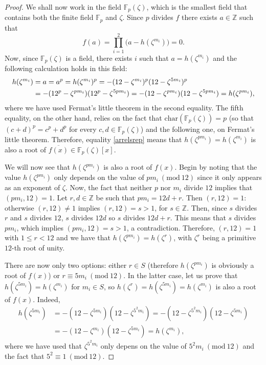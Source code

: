 \documentclass[a4paper, 12pt]{article}
\theoremstyle{definition}
\theoremstyle{remark}
\newcommand{\Z}{\ensuremath{\mathbb{Z}}}
\newcommand{\F}{\ensuremath{\mathbb{F}}}
\newcommand{\Mod}[1]{\ (\mathrm{mod}\ #1)} %
\begin{document}
\begin{proof}
We shall now work in the field $\F_p(\zeta)$, which is the smallest field that contains both the finite field $\F_p$ and $\zeta$. Since $p$ divides $f$ there exists $a\in\Z$ such that 
\begin{equation*}
f(a)=\prod_{i=1}^{2}\big(a-h(\zeta^{m_i})\big)=0.
\end{equation*}
Now, since $\F_p(\zeta)$ is a field, there exists $i$ such that $a=h(\zeta^{m_i})$ and the following calculation holds in this field:
\begin{align}\label{arrelsrep}
h(\zeta^{m_i})&=a=a^p=h(\zeta^{m_i})^p=-(12-\zeta^{m_i})^p(12-\zeta^{5m_i})^p\notag \\ 
&=-(12^p-\zeta^{pm_i})(12^p-\zeta^{5pm_i})=-(12-\zeta^{pm_i})(12-\zeta^{5pm_i})=h(\zeta^{pm_i}),
\end{align}
where we have used Fermat's little theorem in the second equality. The fifth equality, on the other hand, relies on the fact that $\text{char}(\F_p(\zeta))=p$ (so that $(c+d)^p=c^p+d^p$ for every $c,d \in \F_p(\zeta)$) and the following one, on Fermat's little theorem. Therefore, equality \eqref{arrelsrep} means that $h(\zeta^{pm_i})=h(\zeta^{m_i})$ is also a root of $\overline{f(x)}\in\F_p(\zeta)[x]$. 

We will now see that $h(\zeta^{pm_i})$ is also a root of $f(x)$. Begin by noting that the value $h(\zeta^{pm_i})$ only depends on the value of $pm_i \Mod{12}$ since it only appears as an exponent of $\zeta$. Now, the fact that neither $p$ nor $m_i$ divide $12$ implies that $(pm_i,12)=1$. Let $r,d\in\Z$ be such that $pm_i=12d+r$. Then $(r,12)=1$: otherwise $(r,12)\neq 1$ implies $(r,12)=s>1$, for $s\in\Z$. Then, since $s$ divides $r$ and $s$ divides $12$, $s$ divides $12d$ so $s$ divides $12d+r$. This means that $s$ divides $pm_i$, which implies $(pm_i,12)=s>1$, a contradiction. Therefore, $(r,12)=1$ with $1\leqslant r < 12$ and we have that $h(\zeta^{pm_i})=h(\zeta^{r})$, with $\zeta^r$ being a primitive $12$-th root of unity.

There are now only two options: either $r\in S$ (therefore $h(\zeta^{pm_i})$ is obviously a root of $f(x)$) or $r\equiv 5m_i\Mod{12}$. In the latter case, let us prove that $h(\zeta^{5m_i})=h(\zeta^{m_i})$ for $m_i\in S$, so $h(\zeta^{r})=h(\zeta^{5m_i})=h(\zeta^{m_i})$ is also a root of $f(x)$. Indeed,
\begin{align*}
h(\zeta^{5m_i})&=-(12-\zeta^{5m_i})(12-\zeta^{5^2m_i})=-(12-\zeta^{5^2m_i})(12-\zeta^{5m_i})\\
&=-(12-\zeta^{m_i})(12-\zeta^{5m_i})=h(\zeta^{m_i}),
\end{align*}
where we have used that $\zeta^{5^2m_i}$ only depens on the value of $5^2m_i \Mod{12}$ and the fact that $5^2\equiv 1\Mod{12}$.


\end{proof}
\end{document}
